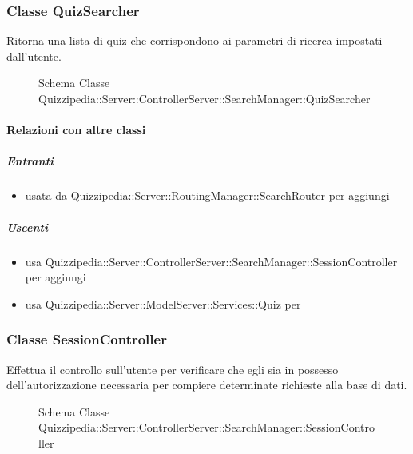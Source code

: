 \subsubsection{Classe QuizSearcher}
Ritorna una lista di quiz che corrispondono ai parametri di ricerca impostati dall'utente.
\begin{figure}[H]
\centering
\noindent{}
\caption[Schema Classe QuizSearcher]{Schema Classe Quizzipedia::Server::ControllerServer::SearchManager::QuizSearcher}
\end{figure}
\paragraph{Relazioni con altre classi}
\subparagraph{Entranti}
\begin{itemize}
\item usata da Quizzipedia::Server::RoutingManager::SearchRouter per aggiungi
\end{itemize}
\subparagraph{Uscenti}
\begin{itemize}
\item usa Quizzipedia::Server::ControllerServer::SearchManager::SessionController per aggiungi
\item usa Quizzipedia::Server::ModelServer::Services::Quiz per 
\end{itemize}
\subsubsection{Classe SessionController}
Effettua il controllo sull'utente per verificare che egli sia in possesso dell'autorizzazione necessaria per compiere determinate richieste alla base di dati.
\begin{figure}[H]
\centering
\noindent{}
\caption[Schema Classe SessionController]{Schema Classe Quizzipedia::Server::ControllerServer::SearchManager::SessionController}
\end{figure}
